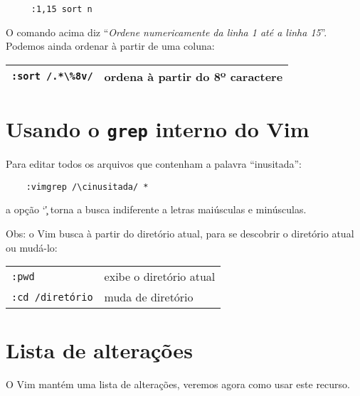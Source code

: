 \begin{verbatim}
     :1,15 sort n
\end{verbatim}

O comando acima diz ``{\em Ordene numericamente da linha 1 até a linha 15}''.  
Podemos ainda ordenar à partir de uma coluna:

\begin{table}[htb]\begin{center} \begin{tabular}{ll} \hline
     \verb|:sort /.*\%8v/| & ordena à partir do 8º caractere\\
\hline \end{tabular}\end{center}\end{table}

\section{Usando o \texttt{grep} interno do Vim}
\label{sec:Usando o grep interno do Vim}

Para editar todos os arquivos que contenham a palavra ``inusitada'':

\begin{verbatim}
    :vimgrep /\cinusitada/ *
\end{verbatim}
a opção `\c' torna a busca indiferente a letras maiúsculas e minúsculas.

Obs: o Vim busca à partir do diretório atual, para se descobrir 
o diretório atual ou mudá-lo:

\begin{table}[htb]\begin{center} \begin{tabular}{ll} \hline
    \verb|:pwd| & exibe o diretório atual\\
    \verb|:cd /diretório| &   muda de diretório\\
\hline \end{tabular}\end{center}\end{table}

\section{Lista de alterações}

O Vim mantém uma lista de alterações, veremos agora como usar este recurso.

